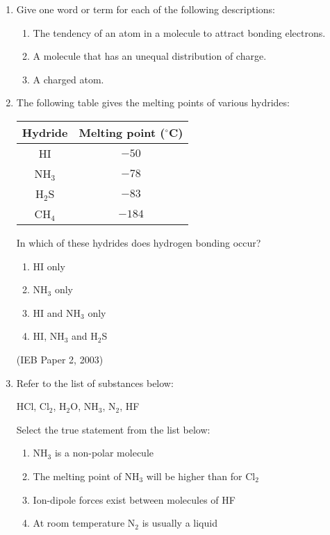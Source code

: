\begin{eocexercises}{}
\begin{enumerate}
\item{Give one word or term for each of the following descriptions:}
\begin{enumerate}
\item{The tendency of an atom in a molecule to attract bonding electrons.}
\item{A molecule that has an unequal distribution of charge.}
\item{A charged atom.}
\end{enumerate}

\item{The following table gives the melting points of various hydrides:}
\begin{center}
\begin{tabular}{|c|c|}\hline
\textbf{Hydride} & \textbf{Melting point} ($^{\circ}$C) \\\hline
HI & $-50$ \\\hline
NH$_{3}$ & $-78$ \\\hline
H$_{2}$S & $-83$ \\\hline
CH$_{4}$ & $-184$ \\\hline
\end{tabular}
\end{center}

In which of these hydrides does hydrogen bonding occur?
\begin{enumerate}
\item{HI only}
\item{NH$_{3}$ only}
\item{HI and NH$_{3}$ only}
\item{HI, NH$_{3}$ and H$_{2}$S}
\end{enumerate}
(IEB Paper 2, 2003)

\item{Refer to the list of substances below:}
\begin{center}
HCl, Cl$_{2}$, H$_{2}$O, NH$_{3}$, N$_{2}$, HF
\end{center}
Select the true statement from the list below:
\begin{enumerate}
\item{NH$_{3}$ is a non-polar molecule}
\item{The melting point of NH$_{3}$ will be higher than for Cl$_{2}$}
\item{Ion-dipole forces exist between molecules of HF}
\item{At room temperature N$_{2}$ is usually a liquid}
\end{enumerate}


\end{enumerate}
\end{eocexercises}
